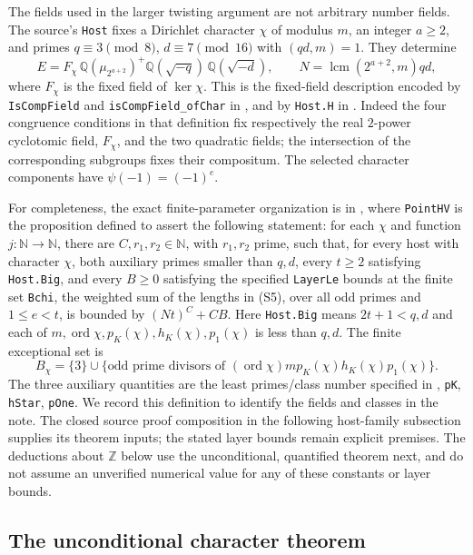 The fields used in the larger twisting argument are not arbitrary number
fields. The source's \texttt{Host} fixes a Dirichlet character $\chi$ of
modulus $m$, an integer $a\ge2$, and primes $q\equiv3\pmod8$,
$d\equiv7\pmod{16}$ with $(qd,m)=1$. They determine
\[
 E=F_\chi\,\mathbb Q(\mu_{2^{a+2}})^+
      \mathbb Q(\sqrt{-q})\,\mathbb Q(\sqrt{-d}),
 \qquad N=\operatorname{lcm}(2^{a+2},m)qd,
 \tag{S6}
\]
where $F_\chi$ is the fixed field of $\ker\chi$. This is the fixed-field
description encoded by \texttt{IsCompField} and
\texttt{isCompField\_ofChar} in , and by
\texttt{Host.H} in
.
Indeed the four congruence conditions in that definition fix respectively
the real $2$-power cyclotomic field, $F_\chi$, and the two quadratic fields;
the intersection of the corresponding subgroups fixes their compositum.
The selected character components have $\psi(-1)=(-1)^e$.

For completeness, the exact finite-parameter organization is in
, where \texttt{PointHV}
is the proposition defined to assert the following statement:
for each $\chi$ and function $j:\mathbb N\to\mathbb N$, there are
$C,r_1,r_2\in\mathbb N$, with $r_1,r_2$ prime, such that, for every host
with character $\chi$, both auxiliary primes smaller than $q,d$, every
$t\ge2$ satisfying \texttt{Host.Big}, and every $B\ge0$ satisfying
the specified \texttt{LayerLe} bounds at the finite set \texttt{Bchi},
the weighted sum of the lengths in (S5), over all odd primes and
$1\le e<t$, is bounded by $(Nt)^C+CB$.
Here \texttt{Host.Big} means $2t+1<q,d$ and each of
$m,\operatorname{ord}\chi,p_K(\chi),h_K(\chi),p_1(\chi)$ is less than
$q,d$. The finite exceptional set is
\[
 B_\chi=\{3\}\cup
 \{\text{odd prime divisors of }
   (\operatorname{ord}\chi)m p_K(\chi)h_K(\chi)p_1(\chi)\}.
\]
The three auxiliary quantities are the least primes/class number specified
in , \texttt{pK}, \texttt{hStar}, \texttt{pOne}.
We record this definition to identify the fields and classes in the
note. The closed source proof composition in the following host-family
subsection supplies its theorem inputs; the stated layer bounds remain
explicit premises. The deductions about $\mathbb Z$ below use the unconditional,
quantified theorem next, and do not assume an unverified numerical value
for any of these constants or layer bounds.

\subsection{The unconditional character theorem}

